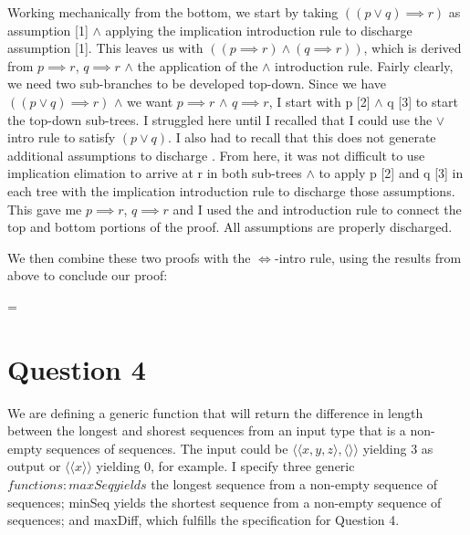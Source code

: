\documentclass[a4paper,10pt,fleqn]{article}
\begin{document}
\noindent Working mechanically from the bottom, we start by taking $((p \lor q) \implies r)$ as assumption [1] $\land$ applying the implication introduction rule to discharge assumption [1].  This leaves us with $((p \implies r) \land (q \implies r))$, which is derived from $p \implies r$, $q \implies r$ $\land$ the application of the $\land$ introduction rule. Fairly clearly, we need two sub-branches to be developed top-down. Since we have $((p \lor q) \implies r)$ $\land$ we want $p \implies r$ $\land$ $q \implies r$, I start with p [2] $\land$ q [3] to start the top-down sub-trees.  I struggled here until I recalled that I could use the $\lor$ intro rule to satisfy $(p \lor q)$.  I also had to recall that this does not generate additional assumptions to discharge \citep[slide 38]{simpson25c}. From here, it was not difficult to use implication elimation to arrive at r in both sub-trees $\land$ to apply p [2] and q [3] in each tree with the implication introduction rule to discharge those assumptions.  This gave me $p \implies r$, $q \implies r$ and I used the and introduction rule to connect the top and bottom portions of the proof. All assumptions are properly discharged.

\bigskip

\noindent We then combine these two proofs with the $\Leftrightarrow$-intro rule, using the results from above to conclude our proof:

\bigskip

\savedleftskip=\leftskip
\noindent
{}
\bigskip

\setlength{\leftskip}{0pt}
\section*{Question 4}

\noindent We are defining a generic function that will return the difference in length between the longest and shorest sequences from an input type that is a non-empty sequences of sequences. The input could be $\langle  \langle x, y, z \rangle, \langle \rangle  \rangle$ yielding 3 as output or $\langle \langle x \rangle \rangle$ yielding 0, for example. I specify three generic $functions : maxSeq yields$ the longest sequence from a non-empty sequence of sequences; minSeq yields the shortest sequence from a non-empty sequence of sequences; and maxDiff, which fulfills the specification for Question 4.
\end{document}
